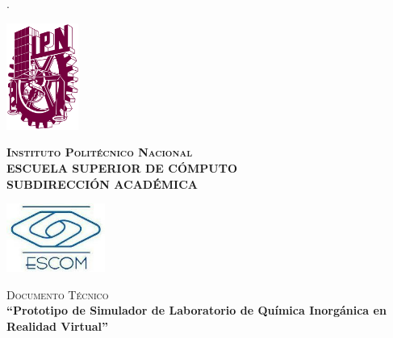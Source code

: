 \thispagestyle{empty}.
    \noindent
    \begin{adjustbox}{max width=\linewidth}
        \begin{minipage}[c][5cm][c]{0.15\textwidth} %
            \centering
            \includegraphics[height=3.5cm,keepaspectratio]{img/logo-ipn.png}
        \end{minipage}
        \begin{minipage}[c][5cm][c]{0.75\textwidth} %
            \centering
            \linespread{2}\selectfont
            {\fontsize{20}{1}\selectfont\textbf{\textsc{Instituto Politécnico Nacional\\}}} 
            {\fontsize{16}{15}\selectfont\textbf{\textsc{ESCUELA SUPERIOR DE CÓMPUTO\\}}} 
            {\fontsize{16}{15}\selectfont\textbf{\textsc{SUBDIRECCIÓN ACADÉMICA\\}}}
        \end{minipage}
        \begin{minipage}[c][5cm][c]{0.15\textwidth} %
            \centering
            \includegraphics[height=2.25cm,keepaspectratio]{img/logo-school.png}
        \end{minipage}
    \end{adjustbox}

    \vspace{1cm} %

    \begin{multicols}{2}
        \begin{flushleft}
            {\fontsize{14}{14}\selectfont{No. De TT: 2024-B059}}
        \end{flushleft}
    
        \begin{flushright}
            {\fontsize{14}{14}\selectfont{19 de diciembre de 2024}}
        \end{flushright}
    \end{multicols}
    \centering
    {\fontsize{14}{14}\selectfont\textsc{Documento Técnico\\}}
    \vspace{20pt}
    {\fontsize{16}{16}\selectfont\textbf{``Prototipo de Simulador de Laboratorio de Química Inorgánica en Realidad Virtual''\\}}

